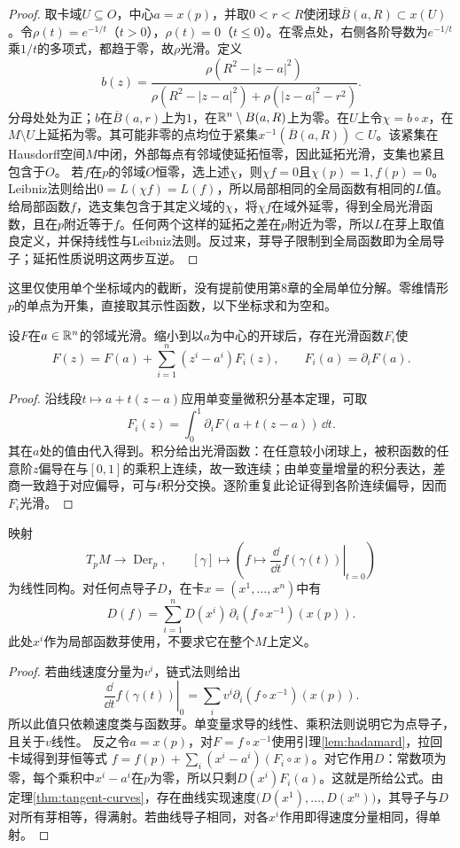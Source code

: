 \begin{proof}
取卡域$U\subseteq O$，中心$a=x(p)$，并取$0<r<R$使闭球$\overline B(a,R)\subset x(U)$。令$\rho(t)=e^{-1/t}$（$t>0$），$\rho(t)=0$（$t\leq0$）。在零点处，右侧各阶导数为$e^{-1/t}$乘$1/t$的多项式，都趋于零，故$\rho$光滑。定义
\[
 b(z)=\frac{\rho(R^2-|z-a|^2)}
 {\rho(R^2-|z-a|^2)+\rho(|z-a|^2-r^2)}.
\]
分母处处为正；$b$在$\overline B(a,r)$上为$1$，在$\mathbb{R}^n\setminus B(a,R)$上为零。在$U$上令$\chi=b\circ x$，在$M\setminus U$上延拓为零。其可能非零的点均位于紧集$x^{-1}(\overline B(a,R))\subset U$。该紧集在Hausdorff空间$M$中闭，外部每点有邻域使延拓恒零，因此延拓光滑，支集也紧且包含于$O$。
若$f$在$p$的邻域$O$恒零，选上述$\chi$，则$\chi f=0$且$\chi(p)=1,f(p)=0$。Leibniz法则给出$0=L(\chi f)=L(f)$，所以局部相同的全局函数有相同的$L$值。
给局部函数$f$，选支集包含于其定义域的$\chi$，将$\chi f$在域外延零，得到全局光滑函数，且在$p$附近等于$f$。任何两个这样的延拓之差在$p$附近为零，所以$L$在芽上取值良定义，并保持线性与Leibniz法则。反过来，芽导子限制到全局函数即为全局导子；延拓性质说明这两步互逆。
\end{proof}
这里仅使用单个坐标域内的截断，没有提前使用第8章的全局单位分解。零维情形$p$的单点为开集，直接取其示性函数，以下坐标求和为空和。
\begin{lemma}[一阶余项分解]\label{lem:hadamard}
设$F$在$a\in\mathbb{R}^n$的邻域光滑。缩小到以$a$为中心的开球后，存在光滑函数$F_i$使
\[
 F(z)=F(a)+\sum_{i=1}^n(z^i-a^i)F_i(z),\qquad F_i(a)=\partial_iF(a).
\]
\end{lemma}
\begin{proof}
沿线段$t\mapsto a+t(z-a)$应用单变量微积分基本定理，可取
\[
 F_i(z)=\int_0^1\partial_iF(a+t(z-a))\,\dd t.
\]
其在$a$处的值由代入得到。积分给出光滑函数：在任意较小闭球上，被积函数的任意阶$z$偏导在与$[0,1]$的乘积上连续，故一致连续；由单变量增量的积分表达，差商一致趋于对应偏导，可与$t$积分交换。逐阶重复此论证得到各阶连续偏导，因而$F_i$光滑。
\end{proof}
\begin{theorem}[曲线与导子模型等价]\label{thm:derivation-model}
映射
\[
 T_pM\longrightarrow\operatorname{Der}_p,\qquad
 [\gamma]\longmapsto\left(f\mapsto\left.\frac{\dd}{\dd t}f(\gamma(t))\right|_{t=0}\right)
\]
为线性同构。对任何点导子$D$，在卡$x=(x^1,\ldots,x^n)$中有
\[
 D(f)=\sum_{i=1}^n D(x^i)\,\partial_i(f\circ x^{-1})(x(p)).
\]
此处$x^i$作为局部函数芽使用，不要求它在整个$M$上定义。
\end{theorem}
\begin{proof}
若曲线速度分量为$v^i$，链式法则给出
\[
 \left.\frac{\dd}{\dd t}f(\gamma(t))\right|_0
 =\sum_i v^i\partial_i(f\circ x^{-1})(x(p)).
\]
所以此值只依赖速度类与函数芽。单变量求导的线性、乘积法则说明它为点导子，且关于$v$线性。
反之令$a=x(p)$，对$F=f\circ x^{-1}$使用引理\ref{lem:hadamard}，拉回卡域得到芽恒等式
$f=f(p)+\sum_i(x^i-a^i)(F_i\circ x)$。对它作用$D$：常数项为零，每个乘积中$x^i-a^i$在$p$为零，所以只剩$D(x^i)F_i(a)$。这就是所给公式。由定理\ref{thm:tangent-curves}，存在曲线实现速度$\bigl(D(x^1),\ldots,D(x^n)\bigr)$，其导子与$D$对所有芽相等，得满射。若曲线导子相同，对各$x^i$作用即得速度分量相同，得单射。
\end{proof}
